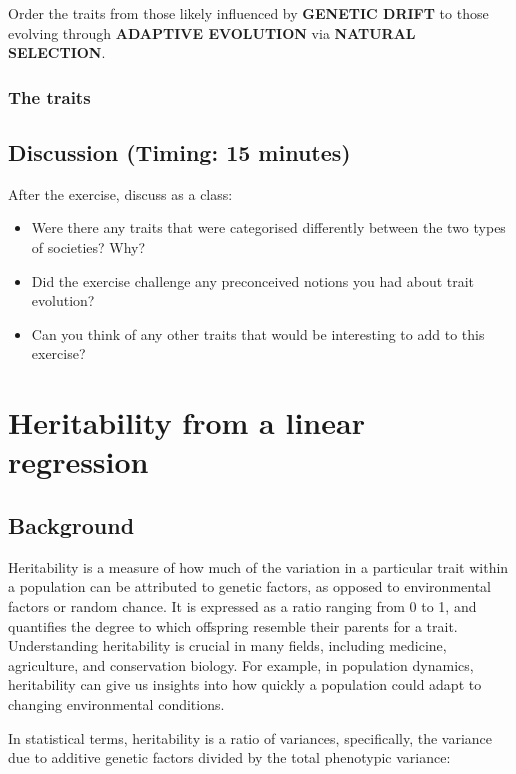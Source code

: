 \documentclass[
  a4paper]{book}
\providecommand{\tightlist}{%
  \setlength{\itemsep}{0pt}\setlength{\parskip}{0pt}}
\begin{document}
Order the traits from those likely influenced by \textbf{GENETIC DRIFT} to those evolving through \textbf{ADAPTIVE EVOLUTION} via \textbf{NATURAL SELECTION}.

\subsection{The traits}\label{the-traits}

\section{Discussion (Timing: 15 minutes)}\label{discussion-timing-15-minutes}

After the exercise, discuss as a class:

\begin{itemize}
\tightlist
\item
  Were there any traits that were categorised differently between the two types of societies? Why?
\item
  Did the exercise challenge any preconceived notions you had about trait evolution?
\item
  Can you think of any other traits that would be interesting to add to this exercise?
\end{itemize}

\chapter{Heritability from a linear regression}\label{heritability-from-a-linear-regression}

\section{Background}\label{background-14}

Heritability is a measure of how much of the variation in a particular trait within a population can be attributed to genetic factors, as opposed to environmental factors or random chance. It is expressed as a ratio ranging from 0 to 1, and quantifies the degree to which offspring resemble their parents for a trait. Understanding heritability is crucial in many fields, including medicine, agriculture, and conservation biology. For example, in population dynamics, heritability can give us insights into how quickly a population could adapt to changing environmental conditions.

In statistical terms, heritability is a ratio of variances, specifically, the variance due to additive genetic factors divided by the total phenotypic variance:
\end{document}
